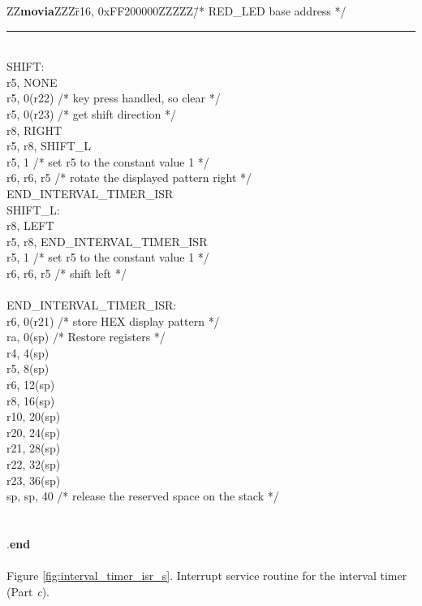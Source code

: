 \begin{center}
\begin{minipage}[t]{12.5 cm}
\begin{tabbing}
ZZ\={\bf movia}ZZZ\=r16, 0xFF200000ZZZZZ\=/* RED\_LED base address */\kill
\rule{6.0in}{0in}~\\
SHIFT:\\
	\>r5, NONE\\
	\>r5, 0(r22)	\>/* key press handled, so clear */\\
	\>r5, 0(r23)	\>/* get shift direction */\\
	\>r8, RIGHT\\
		r5, r8, SHIFT\_L	\\
	\>r5, 1	\>/* set r5 to the constant value 1 */\\
	\>r6, r6, r5	\>/* rotate the displayed pattern right */\\
	\>END\_INTERVAL\_TIMER\_ISR\\
SHIFT\_L:\\
	\>r8, LEFT\\
	\>r5, r8, END\_INTERVAL\_TIMER\_ISR	\\
	\>r5, 1	\>/* set r5 to the constant value 1 */\\
	\>r6, r6, r5	\>/* shift left */\\
~\\
END\_INTERVAL\_TIMER\_ISR:\\
 \>r6, 0(r21) \>/* store HEX display pattern */\\
 \>ra, 0(sp) \>/* Restore registers */\\
	\>r4, 4(sp)\\
	\>r5, 8(sp)\\
	\>r6, 12(sp)\\
	\>r8, 16(sp)\\
	\>r10, 20(sp)\\
	\>r20, 24(sp)\\
	\>r21, 28(sp)\\
	\>r22, 32(sp)\\
	\>r23, 36(sp)	\\
 \>sp, sp, 40 \>/* release the reserved space on the stack */\\
\\\\
\>.{\bf end}\\
~\\
Figure \ref{fig:interval_timer_isr_s}. Interrupt service routine for the interval timer (Part {\it c}).
\end{tabbing}
\end{minipage}
\end{center}
